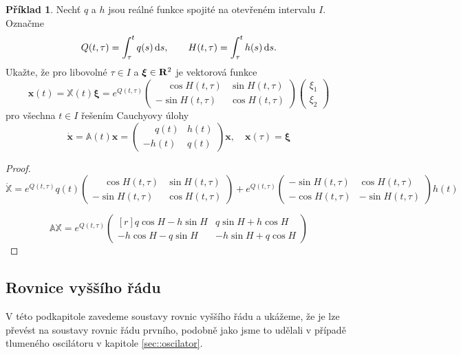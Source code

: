 \documentclass[a4paper, 12pt]{book}
\theoremstyle{definition}
\newtheorem{example}[theorem]{Příklad}
\def\Real{{\rm\bf R}}
\def\d{\,{\rm d}}               %
\def\vc#1{\mathbf{\boldsymbol{#1}}}     %
\def\tn#1{{\mathbb{#1}}}    %
\begin{document}
\begin{example}
Nechť $q$ a $h$ jsou reálné funkce spojité na otevřeném intervalu $I$.
Označme
\[
    Q(t,\tau) = \int_\tau^t q(s)\d s,\qquad 
    H(t,\tau) = \int_\tau^t h(s)\d s.
\]
Ukažte, že pro libovolné $\tau\in I$ a $\vc \xi \in \Real^2$ je vektorová 
funkce
\[
\vc x(t) = \tn X(t) \vc \xi = e^{Q(t,\tau)}
\begin{pmatrix}
\phantom{-}\cos H(t,\tau)  & \sin H(t,\tau)\\
-\sin H(t,\tau) & \cos H(t,\tau)
\end{pmatrix} 
\begin{pmatrix}
 \xi_1 \\
 \xi_2
\end{pmatrix}
\]
pro všechna $t\in I$ řešením Cauchyovy úlohy
\[
 \dot{\vc x} = \tn A(t) \vc x = 
 \begin{pmatrix}
  \phantom{-}q(t) & h(t) \\
  -h(t) & q(t)
 \end{pmatrix}
 \vc x,
 \quad \vc x(\tau) = \vc \xi
\]
\end{example}
\begin{proof}
\[
 \dot{\tn X} = e^{Q(t,\tau)} q(t)
\begin{pmatrix}
\phantom{-}\cos H(t,\tau)  & \sin H(t,\tau)\\
-\sin H(t,\tau) & \cos H(t,\tau)
\end{pmatrix} 
+
e^{Q(t,\tau)} 
\begin{pmatrix}
-\sin H(t,\tau)  & \cos H(t,\tau)\\
-\cos H(t,\tau) & -\sin H(t,\tau)
\end{pmatrix}
h(t)
\]

\[
 \tn A \tn X =  e^{Q(t,\tau)} 
\begin{pmatrix*}[r]
q \cos H - h \sin H   &  q \sin H + h \cos H \\
-h \cos H - q \sin H   &  -h \sin H + q \cos H
\end{pmatrix*} 
\]

\end{proof}

\subsection{Rovnice vyššího řádu}
V této podkapitole zavedeme soustavy rovnic vyššího řádu a ukážeme, že je lze převést na 
soustavy rovnic řádu prvního, podobně jako jsme to udělali v případě tlumeného oscilátoru 
v kapitole \ref{sec::oscilator}.
\end{document}
